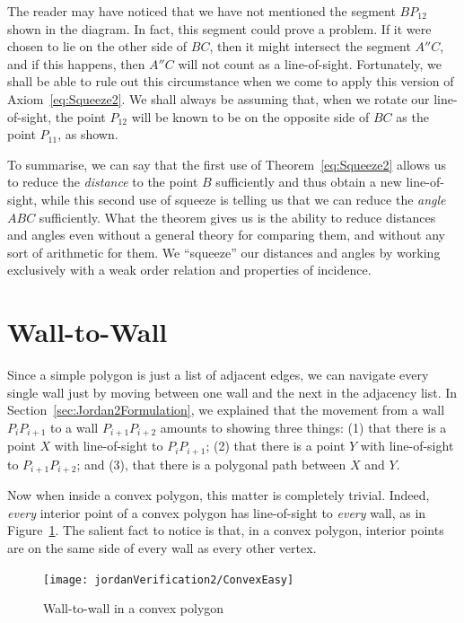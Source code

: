 The reader may have noticed that we have not mentioned the segment $BP_{12}$ shown in the diagram. In fact, this segment could prove a problem. If it were chosen to lie on the other side of $BC$, then it might intersect the segment $A''C$, and if this happens, then $A''C$ will not count as a line-of-sight. Fortunately, we shall be able to rule out this circumstance when we come to apply this version of Axiom~\ref{eq:Squeeze2}. We shall always be assuming that, when we rotate our line-of-sight, the point $P_{12}$ will be known to be on the opposite side of $BC$ as the point $P_{11}$, as shown.

To summarise, we can say that the first use of Theorem~\ref{eq:Squeeze2} allows us to reduce the \emph{distance} to the point $B$ sufficiently and thus obtain a new line-of-sight, while this second use of squeeze is telling us that we can reduce the \emph{angle} $ABC$ sufficiently. What the theorem gives us is the ability to reduce distances and angles even without a general theory for comparing them, and without any sort of arithmetic for them. We ``squeeze'' our distances and angles by working exclusively with a weak order relation and properties of incidence.

\section{Wall-to-Wall}\label{sec:NavigationVerification}
Since a simple polygon is just a list of adjacent edges, we can navigate every single wall just by moving between one wall and the next in the adjacency list. In Section~\ref{sec:Jordan2Formulation}, we explained that the movement from a wall $P_{i}P_{i+1}$ to a wall $P_{i+1}P_{i+2}$ amounts to showing three things: (1) that there is a point $X$ with line-of-sight to $P_{i}P_{i+1}$; (2) that there is a point $Y$ with line-of-sight to $P_{i+1}P_{i+2}$; and (3), that there is a polygonal path between $X$ and $Y$.

Now when inside a convex polygon, this matter is completely trivial. Indeed, \emph{every} interior point of a convex polygon has line-of-sight to \emph{every} wall, as in Figure~\ref{fig:ConvexEasy}. The salient fact to notice is that, in a convex polygon, interior points are on the same side of every wall as every other vertex. 

\begin{figure}
\centering\texttt{[image: jordanVerification2/ConvexEasy]}
\caption{Wall-to-wall in a convex polygon}
\label{fig:ConvexEasy}
\end{figure}

